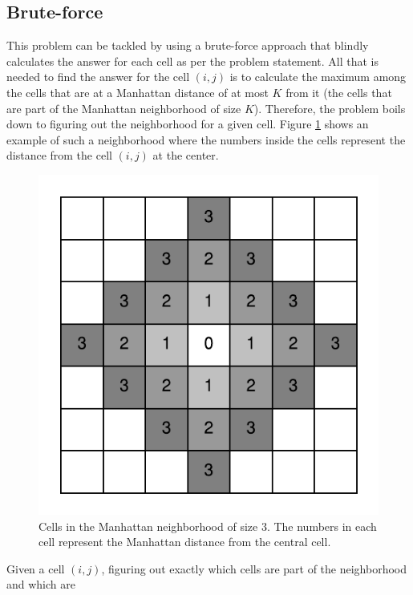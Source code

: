 \subsection{Brute-force}
\label{max_manhattan:sec:bruteforce}
This problem can be  tackled by using a brute-force approach that blindly calculates the answer for each cell as per the problem statement. 
All that is needed to find the answer for the cell $(i,j)$ is to calculate the maximum among the cells that are at a Manhattan distance of at most $K$ from it (the cells that are part of the Manhattan
neighborhood of size $K$). Therefore, the problem boils down to figuring out the neighborhood for a
given cell. Figure \ref{fig:max_manhattan:neighborhood} shows an example of such a neighborhood
where the numbers inside the cells represent the distance from the cell $(i,j)$ at the center. 
\begin{figure}
    \centering
    \includegraphics[width=\textwidth]{sources/max_manhattan/images/neighborhood}
    \caption[Cells in the Manhattan neighborhood of size $3$.]{Cells in the Manhattan neighborhood
    of size $3$. The numbers in each cell represent the Manhattan distance from the central cell.}
    \label{fig:max_manhattan:neighborhood}
\end{figure}
Given a cell $(i,j)$, figuring out exactly which cells are part of the neighborhood and which are
